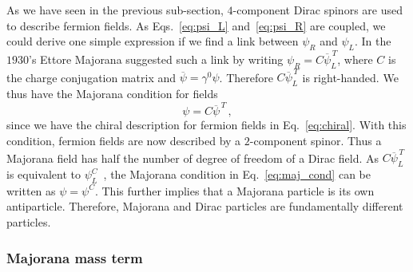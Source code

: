 As we have seen in the previous sub-section, $4$-component Dirac spinors are used to describe fermion fields.
As Eqs.~\eqref{eq:psi_L} and~\eqref{eq:psi_R} are coupled, we could derive one simple expression if we find a link between $\psi_R$ and $\psi_L$.
In the $1930$'s Ettore Majorana suggested such a link by writing $\psi_R = C\overline{\psi}_L^{\,T}$, where $C$ is the charge conjugation matrix and $\overline{\psi} = \gamma^0\psi$.
Therefore $C\overline{\psi}_L^{\,T}$ is right-handed.
We thus have the Majorana condition for fields
\begin{equation}
  \psi=C\overline{\psi}^{\,T}\,,
  \label{eq:maj_cond}
\end{equation}
since we have the chiral description for fermion fields in Eq.~\eqref{eq:chiral}.
With this condition, fermion fields are now described by a $2$-component spinor.
Thus a Majorana field has half the number of degree of freedom of a Dirac field.
As $C\overline{\psi}_L^{\,T}$ is equivalent to $\psi_{L}^{C}$~\cite{book:giunti}, the Majorana condition in Eq.~\eqref{eq:maj_cond} can be written as $\psi = \psi^C$.
This further implies that a Majorana particle is its own antiparticle.
Therefore, Majorana and Dirac particles are fundamentally different particles.

\subsubsection*{Majorana mass term}

